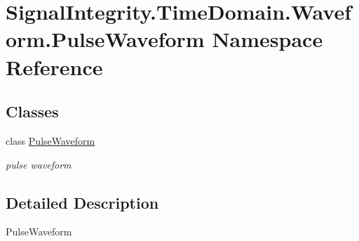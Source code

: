 \hypertarget{namespaceSignalIntegrity_1_1TimeDomain_1_1Waveform_1_1PulseWaveform}{}\section{Signal\+Integrity.\+Time\+Domain.\+Waveform.\+Pulse\+Waveform Namespace Reference}
\label{namespaceSignalIntegrity_1_1TimeDomain_1_1Waveform_1_1PulseWaveform}
\subsection*{Classes}
\begin{DoxyCompactItemize}
\item 
class \hyperlink{classSignalIntegrity_1_1TimeDomain_1_1Waveform_1_1PulseWaveform_1_1PulseWaveform}{Pulse\+Waveform}
\begin{DoxyCompactList}\small\item\em pulse waveform \end{DoxyCompactList}\end{DoxyCompactItemize}


\subsection{Detailed Description}
\begin{DoxyVerb}PulseWaveform\end{DoxyVerb}
 